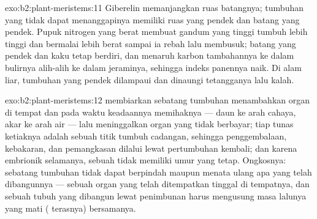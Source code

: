 \begin{solution}{exo:b2:plant-meristems:11}
Giberelin memanjangkan ruas batangnya; tumbuhan yang tidak dapat
menanggapinya memiliki ruas yang pendek dan batang yang pendek. Pupuk
nitrogen yang berat membuat gandum yang tinggi tumbuh lebih tinggi dan
bermalai lebih berat sampai ia rebah lalu membusuk; batang yang pendek
dan kaku tetap berdiri, dan menaruh karbon tambahannya ke dalam
bulirnya alih-alih ke dalam jeraminya, sehingga indeks panennya naik.
Di alam liar, tumbuhan yang pendek dilampaui dan dinaungi tetangganya
lalu kalah.
\end{solution}

\begin{solution}{exo:b2:plant-meristems:12}
 membiarkan sebatang tumbuhan menambahkan organ di tempat dan
pada waktu keadaannya memihaknya --- daun ke arah cahaya, akar ke arah
air --- lalu meninggalkan organ yang tidak berbayar; tiap tunas
ketiaknya adalah sebuah titik tumbuh cadangan, sehingga penggembalaan,
kebakaran, dan pemangkasan dilalui lewat pertumbuhan kembali; dan
karena  embrionik selamanya, sebuah  tidak memiliki
umur yang tetap. Ongkosnya: sebatang tumbuhan tidak dapat berpindah
maupun menata ulang apa yang telah dibangunnya --- sebuah organ yang
telah ditempatkan tinggal di tempatnya, dan sebuah tubuh yang dibangun
lewat penimbunan harus mengusung masa lalunya yang mati ( terasnya)
bersamanya.
\end{solution}

